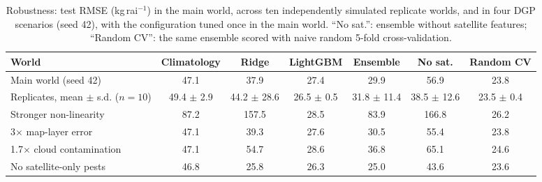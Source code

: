 \begin{table}[t]\centering\scriptsize
\caption{Robustness: test RMSE (kg\,rai$^{-1}$) in the main world, across ten independently simulated replicate worlds, and in four DGP scenarios (seed 42), with the configuration tuned once in the main world. ``No sat.'': ensemble without satellite features; ``Random CV'': the same ensemble scored with naive random 5-fold cross-validation.}\label{tab:robust}
\begin{tabular}{@{}lcccccc@{}}
\toprule
World & Climatology & Ridge & LightGBM & Ensemble & No sat. & Random CV \\
\midrule
Main world (seed 42) & 47.1 & 37.9 & 27.4 & 29.9 & 56.9 & 23.8 \\
Replicates, mean $\pm$ s.d. ($n=10$) & 49.4 $\pm$ 2.9 & 44.2 $\pm$ 28.6 & 26.5 $\pm$ 0.5 & 31.8 $\pm$ 11.4 & 38.5 $\pm$ 12.6 & 23.5 $\pm$ 0.4 \\
\midrule
Stronger non-linearity & 87.2 & 157.5 & 28.5 & 83.9 & 166.8 & 26.2 \\
3$\times$ map-layer error & 47.1 & 39.3 & 27.6 & 30.5 & 55.4 & 23.8 \\
1.7$\times$ cloud contamination & 47.1 & 54.7 & 28.6 & 36.8 & 65.1 & 24.6 \\
No satellite-only pests & 46.8 & 25.8 & 26.3 & 25.0 & 43.6 & 23.6 \\
\bottomrule
\end{tabular}
\end{table}